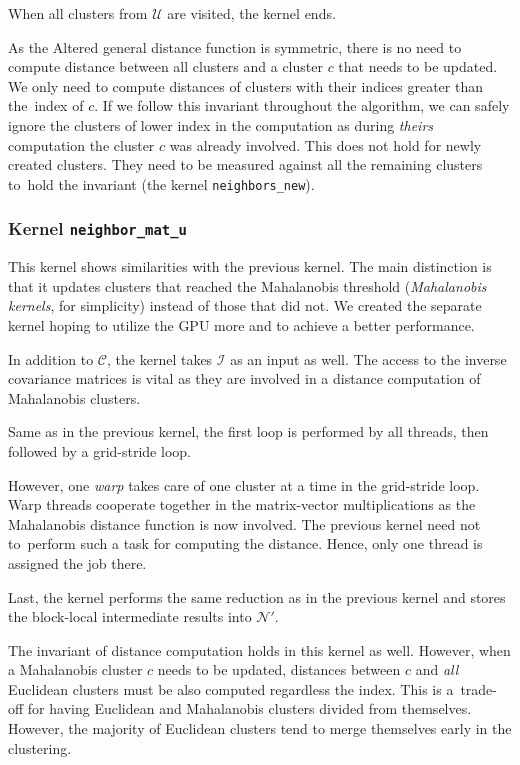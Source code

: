 When all clusters from $\mathcal{U}$ are visited, the kernel ends.

\begin{rem}
	As the Altered general distance function is symmetric, there is no need to compute distance between all clusters and a cluster $c$ that needs to be updated. We only need to compute distances of clusters with their indices greater than the~index of $c$. If we follow this invariant throughout the algorithm, we can safely ignore the clusters of lower index in the computation as during \emph{theirs} computation the cluster $c$ was already involved. This does not hold for newly created clusters. They need to be measured against all the remaining clusters to~hold the invariant (the kernel \texttt{neighbors\_new}).
\end{rem}

\subsubsection{Kernel \texttt{neighbor\_mat\_u}} This kernel shows similarities with the previous kernel. The main distinction is that it updates clusters that reached the Mahalanobis threshold (\emph{Mahalanobis kernels}, for simplicity) instead of those that did not. We created the separate kernel hoping to utilize the GPU more and to achieve a better performance.

In addition to $\mathcal{C}$, the kernel takes $\mathcal{I}$ as an input as well. The access to the inverse covariance matrices is vital as they are involved in a distance computation of Mahalanobis clusters. 

Same as in the previous kernel, the first loop is performed by all threads, then followed by a grid-stride loop. 

However, one \emph{warp} takes care of one cluster at a time in the grid-stride loop. Warp threads cooperate together in the matrix-vector multiplications as the Mahalanobis distance function is now involved. The previous kernel need not to~perform such a task for computing the distance. Hence, only one thread is assigned the job there.

Last, the kernel performs the same reduction as in the previous kernel and stores the block-local intermediate results into $\mathcal{N}'$.

\begin{rem}
	The invariant of distance computation holds in this kernel as well. However, when a Mahalanobis cluster $c$ needs to be updated, distances between $c$ and \emph{all} Euclidean clusters must be also computed regardless the index. This is a~trade-off for having Euclidean and Mahalanobis clusters divided from themselves. However, the majority of Euclidean clusters tend to merge themselves early in the clustering.
\end{rem}

